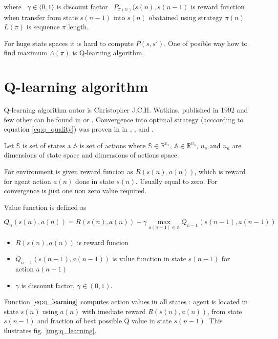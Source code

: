 \documentclass{acmbulletin}
\begin{document}
where \
$\gamma \in \langle 0, 1 \rangle$ is discount factor \
$P_{\pi(n)}{(s(n), s(n-1)}$ is reward function when transfer from state $s(n-1)$ into $s(n)$ obatained using
strategy $\pi(n)$\
$L(\pi)$ is sequence $\pi$ length.

For huge state spaces it is hard to compute $P(s, s')$. One of posible way how
to find maximum $\Lambda(\pi)$ is Q-learning algorithm.

\section{Q-learning algorithm}

Q-learning algorithm autor is Christopher J.C.H. Watkins, published in 1992
\cite{bib:q_learning_watkins} and few other can be found in \cite{bib:q_tutorial_01} or
\cite{bib:q_tutorial_02}. Convergence into optimal strategy (acccording to equation \ref{eq:q_quality}) was proven in
in \cite{bib:q_proof_01}, \cite{bib:q_proof_02}, \cite{bib:q_proof_03} and \cite{bib:q_proof_04}.

Let $\mathbb{S}$ is set of states a $\mathbb{A}$ is set of actions
where $\mathbb{S} \in \mathbb{R}^{n_s}$, $\mathbb{A} \in \mathbb{R}^{n_a}$,
$n_s$ and  $n_a$ are dimensions of state space and dimensions of actions space.

For environment is given reward funcion as $R(s(n),a(n))$,
which is reward for agent action $a(n)$ done in state $s(n)$. Usually equal to zero.
For convergence is just one non zero value required.

Value function is defined as

\begin{equation}
Q_{n}(s(n),a(n)) = R(s(n),a(n)) + \gamma \max_{a(n-1) \in \mathbb{A}} Q_{n-1}(s(n-1), a(n-1))
\label{eq:q_learning}
\end{equation}

\begin{itemize}
 \item $R(s(n),a(n))$ is reward funcion
 \item $Q_{n-1}(s(n-1),a(n-1))$ is value function in state $s(n-1)$ for action $a(n-1)$
 \item $\gamma$ is discount factor, $\gamma \in (0, 1)$.
\end{itemize}

Function $\ref{eq:q_learning}$ computes action values in all states :
agent is located in state $s(n)$ using $a(n)$ with imediate reward $R(s(n),a(n))$,
from state $s(n-1)$ and fraction of best possible Q value in state $s(n-1)$.
This ilustrates fig. \ref{img:q_learning}.
\end{document}
